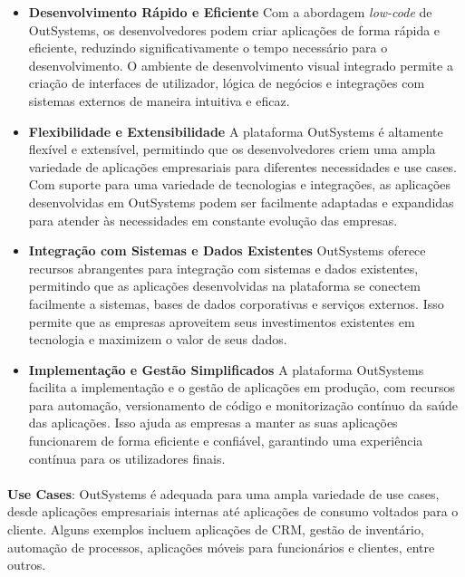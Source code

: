 \documentclass[pdflatex,sn-mathphys-num]{sn-jnl}
\theoremstyle{thmstyleone}
\theoremstyle{thmstyletwo}
\theoremstyle{thmstylethree}
\begin{document}
\begin{itemize}
    \item \textbf{Desenvolvimento Rápido e Eficiente} \newline
    Com a abordagem \textit{low-code} de OutSystems, os desenvolvedores podem criar aplicações de forma rápida e eficiente, reduzindo significativamente o tempo necessário para o desenvolvimento. O ambiente de desenvolvimento visual integrado permite a criação de interfaces de utilizador, lógica de negócios e integrações com sistemas externos de maneira intuitiva e eficaz.\cite{bib11}
    \item \textbf{Flexibilidade e Extensibilidade} \newline
    A plataforma OutSystems é altamente flexível e extensível, permitindo que os desenvolvedores criem uma ampla variedade de aplicações empresariais para diferentes necessidades e use cases. Com suporte para uma variedade de tecnologias e integrações, as aplicações desenvolvidas em OutSystems podem ser facilmente adaptadas e expandidas para atender às necessidades em constante evolução das empresas.\cite{bib11}
    \item \textbf{Integração com Sistemas e Dados Existentes} \newline
    OutSystems oferece recursos abrangentes para integração com sistemas e dados existentes, permitindo que as aplicações desenvolvidas na plataforma se conectem facilmente a sistemas, bases de dados corporativas e serviços externos. Isso permite que as empresas aproveitem seus investimentos existentes em tecnologia e maximizem o valor de seus dados.\cite{bib11}
    \item \textbf{Implementação e Gestão Simplificados} \newline
    A plataforma OutSystems facilita a implementação e o gestão de aplicações em produção, com recursos para automação, versionamento de código e monitorização contínuo da saúde das aplicações. Isso ajuda as empresas a manter as suas aplicações funcionarem de forma eficiente e confiável, garantindo uma experiência contínua para os utilizadores finais.\cite{bib11}
\end{itemize}
\paragraph{}\textbf{Use Cases}:
\newline OutSystems é adequada para uma ampla variedade de use cases, desde aplicações empresariais internas até aplicações de consumo voltados para o cliente. Alguns exemplos incluem aplicações de CRM\cite{bib13}, gestão de inventário, automação de processos, aplicações móveis para funcionários e clientes, entre outros.\cite{bib10}
\end{document}
